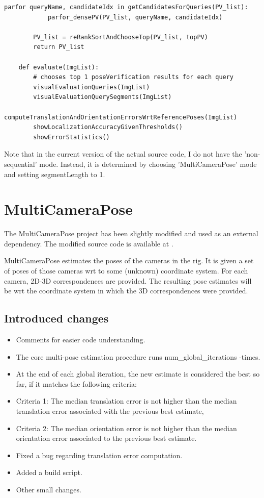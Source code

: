 \documentclass[twoside]{ctuthesis}
\theoremstyle{plain}
\theoremstyle{definition}
\theoremstyle{note}
\newcommand{\code}[1]{{\ttfamily #1%
}}
\begin{document}
\begin{lstlisting}[style=pseudocode, caption={\code{InLocCIIRC\_demo} pseudocode.}]
		parfor queryName, candidateIdx in getCandidatesForQueries(PV_list):
			parfor_densePV(PV_list, queryName, candidateIdx)

		PV_list = reRankSortAndChooseTop(PV_list, topPV)
		return PV_list

	def evaluate(ImgList):
		# chooses top 1 poseVerification results for each query
		visualEvaluationQueries(ImgList)
		visualEvaluationQuerySegments(ImgList)
		computeTranslationAndOrientationErrorsWrtReferencePoses(ImgList)
		showLocalizationAccuracyGivenThresholds()
		showErrorStatistics()
\end{lstlisting}

Note that in the current version of the actual source code, I do not have the 'non-sequential' mode. Instead, it is determined by choosing 'MultiCameraPose' mode and setting segmentLength to 1.

\section{\code{MultiCameraPose}}
The \code{MultiCameraPose} project has been slightly modified and used as an external dependency. The modified source code is available at \cite{MultiCameraPose}.

\code{MultiCameraPose} estimates the poses of the cameras in the rig. It is given a set of poses of those cameras wrt to some (unknown) coordinate system. For each camera, 2D-3D correspondences are provided. The resulting pose estimates will be wrt the coordinate system in which the 3D correspondences were provided.

\subsection{Introduced changes}
\begin{itemize}
	\item Comments for easier code understanding.
	\item The core multi-pose estimation procedure runs \code{num\_global\_iterations}-times.
	\item At the end of each global iteration, the new estimate is considered the best so far, if it matches the following criteria:
	\item Criteria 1: The median translation error is not higher than the median translation error associated with the previous best estimate,
	\item Criteria 2: The median orientation error is not higher than the median orientation error associated to the previous best estimate.
	\item Fixed a bug regarding translation error computation.
	\item Added a build script.
	\item Other small changes.
\end{itemize}
\end{document}
